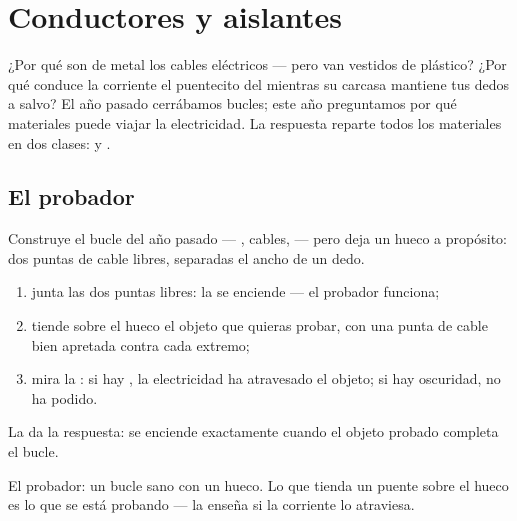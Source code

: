\chapter{Conductores y aislantes}\label{ch:g4:conductors-insulators}

¿Por qué son de metal los cables eléctricos --- pero van vestidos de
plástico? ¿Por qué conduce la corriente el puentecito del
 mientras su carcasa mantiene tus dedos a salvo? El año
pasado cerrábamos bucles; este año preguntamos por qué materiales
puede viajar la electricidad. La respuesta reparte todos los
materiales en dos clases:  y .

\section{El probador}

\begin{method}\label{met:g4:conductors-insulators:tester}
Construye el bucle del año pasado --- , cables,  ---
pero deja un hueco a propósito: dos puntas de cable libres, separadas
el ancho de un dedo.
\begin{enumerate}
  \item junta las dos puntas libres: la  se enciende ---
        el probador funciona;
  \item tiende sobre el hueco el objeto que quieras probar, con una
        punta de cable bien apretada contra cada extremo;
  \item mira la : si hay , la electricidad ha
        atravesado el objeto; si hay oscuridad, no ha podido.
\end{enumerate}
La  da la respuesta: se enciende exactamente cuando el
objeto probado completa el bucle.
\end{method}

\begin{omfigure}

{\small El probador: un bucle sano con un hueco. Lo que tienda un
puente sobre el hueco es lo que se está probando --- la 
enseña si la corriente lo atraviesa.}
\end{omfigure}

